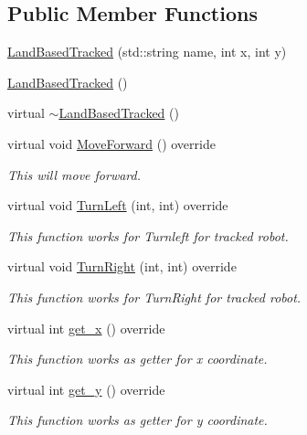 \subsection*{Public Member Functions}
\begin{DoxyCompactItemize}
\item 
\hyperlink{classfp_1_1_land_based_tracked_a165b455a487d13eddfd5f015bc579b95}{Land\+Based\+Tracked} (std\+::string name, int x, int y)
\item 
\hyperlink{classfp_1_1_land_based_tracked_a0f9489dc8ef0310ced4f2526a610a0e0}{Land\+Based\+Tracked} ()
\item 
virtual \hyperlink{classfp_1_1_land_based_tracked_a8d3033324bbc96fde30ce107c1694af3}{$\sim$\+Land\+Based\+Tracked} ()
\item 
virtual void \hyperlink{classfp_1_1_land_based_tracked_af537a096f507674b62a9691fad7c6cb7}{Move\+Forward} () override
\begin{DoxyCompactList}\small\item\em This will move forward. \end{DoxyCompactList}\item 
virtual void \hyperlink{classfp_1_1_land_based_tracked_aab40e1a48e5142491f02b2936c4cacc3}{Turn\+Left} (int, int) override
\begin{DoxyCompactList}\small\item\em This function works for Turnleft for tracked robot. \end{DoxyCompactList}\item 
virtual void \hyperlink{classfp_1_1_land_based_tracked_a619c29950f6c484d3481e31ff01dad3a}{Turn\+Right} (int, int) override
\begin{DoxyCompactList}\small\item\em This function works for Turn\+Right for tracked robot. \end{DoxyCompactList}\item 
virtual int \hyperlink{classfp_1_1_land_based_tracked_a3a4fc3c84dd3fcf1928a27af1658680f}{get\+\_\+x} () override
\begin{DoxyCompactList}\small\item\em This function works as getter for x coordinate. \end{DoxyCompactList}\item 
virtual int \hyperlink{classfp_1_1_land_based_tracked_a09738928390e7e0d33444b6a7cfcc841}{get\+\_\+y} () override
\begin{DoxyCompactList}\small\item\em This function works as getter for y coordinate. \end{DoxyCompactList}\item 

\end{DoxyCompactItemize}
